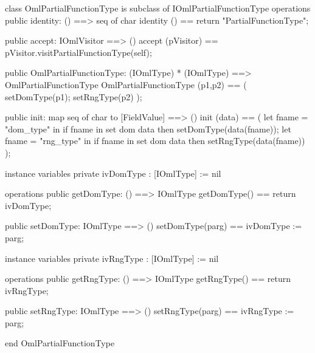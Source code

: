 \begin{vdm_al}
class OmlPartialFunctionType is subclass of IOmlPartialFunctionType
operations
  public identity: () ==> seq of char
  identity () == return "PartialFunctionType";

  public accept: IOmlVisitor ==> ()
  accept (pVisitor) == pVisitor.visitPartialFunctionType(self);

  public OmlPartialFunctionType:
      (IOmlType) *
      (IOmlType) ==> OmlPartialFunctionType
  OmlPartialFunctionType (p1,p2) == 
   ( setDomType(p1);
     setRngType(p2) );

  public init: map seq of char to [FieldValue] ==> ()
  init (data) ==
    ( let fname = "dom_type" in
        if fname in set dom data
        then setDomType(data(fname));
      let fname = "rng_type" in
        if fname in set dom data
        then setRngType(data(fname)) );

instance variables
  private ivDomType : [IOmlType] := nil

operations
  public getDomType: () ==> IOmlType
  getDomType() == return ivDomType;

  public setDomType: IOmlType ==> ()
  setDomType(parg) == ivDomType := parg;

instance variables
  private ivRngType : [IOmlType] := nil

operations
  public getRngType: () ==> IOmlType
  getRngType() == return ivRngType;

  public setRngType: IOmlType ==> ()
  setRngType(parg) == ivRngType := parg;

end OmlPartialFunctionType
\end{vdm_al}

